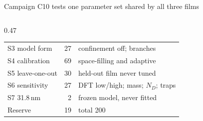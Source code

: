 \begin{frame}[t]{Campaign C10 tests one parameter set shared by all three films}
\begin{columns}[T,onlytextwidth]
\begin{column}{0.47\textwidth}
{\begin{tabularx}{\linewidth}{@{}l r>{\raggedright\arraybackslash}X@{}}
        S3 model form & 27 & confinement off; branches \\
        S4 calibration & 69 & space-filling and adaptive \\
        S5 leave-one-out & 30 & held-out film never tuned \\
        S6 sensitivity & 27 & DFT low/high; mass; $N_D$; traps \\
        S7 31.8\,nm & 2 & frozen model, never fitted \\
        \midrule
        Reserve & 19 & total 200 \\
        \bottomrule
      \end{tabularx}\par}
    \end{column}
  \end{columns}
\end{frame}

